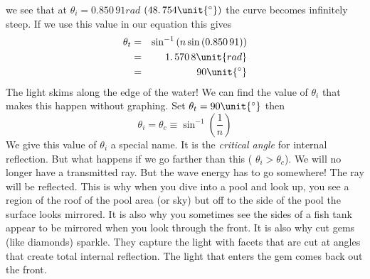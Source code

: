 \documentclass{article}
\begin{document}
we see that at $\theta
_{i}=\allowbreak 0.850\,91\unit{rad}$ $(48.\,\allowbreak 754\unit{%
{{}^\circ}%
})$ the curve becomes infinitely steep. If we use this value in our equation
this gives%
\begin{eqnarray}
\theta _{t} &=&\sin ^{-1}\left( n\sin \left( \allowbreak 0.850\,91\right)
\right) \\
&=&1.\,\allowbreak 570\,8\unit{rad} \\
&=&90\unit{%
{{}^\circ}%
}
\end{eqnarray}%
The light skims along the edge of the water! We can find the value of $\theta
_{i}$ that makes this happen without graphing. Set $\theta _{t}=90\unit{%
{{}^\circ}%
}$ then%
\begin{equation}
\theta _{i}=\theta _{c}\equiv \sin ^{-1}\left( \frac{1}{n}\right)
\end{equation}%
We give this value of $\theta _{i}$ a special name. It is the \emph{critical
angle} for internal reflection. But what happens if we go farther than this (%
$\theta _{i}>\theta _{c}$). We will no longer have a transmitted ray. But
the wave energy has to go somewhere! The ray will be reflected. This is why
when you dive into a pool and look up, you see a region of the roof of the
pool area (or sky) but off to the side of the pool the surface looks
mirrored. It is also why you sometimes see the sides of a fish tank appear
to be mirrored when you look through the front. It is also why cut gems (like
diamonds) sparkle. They capture the light with facets that are cut at angles
that create total internal reflection. The light that enters the gem comes
back out the front.
\end{document}
